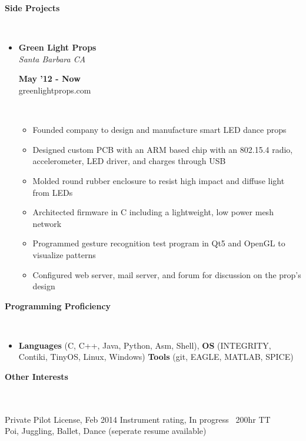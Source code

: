 \documentclass[a4paper,11pt]{article}
\newcommand{\lsep}{-0.5cm}
\newcommand{\resheading}[1]{{\small \colorbox{mygrey}{\begin{minipage}{0.975\textwidth}{\textbf{#1 \vphantom{p\^{E}}}}\end{minipage}}}}
\newcommand{\workexp}[4]{
\begin{minipage}[t]{7cm}
\flushleft
\textbf{#1} \\
\indent \emph{#2}\\
\end{minipage}
\begin{minipage}[t]{7cm}
\flushright
\textbf{#3} \\
\indent #4 \\
\end{minipage}
}
\begin{document}

\resheading{\textbf{Side Projects}}\\[\lsep]

\begin{itemize}
\item \workexp{Green Light Props}{Santa Barbara CA}{May '12 - Now}{greenlightprops.com}
\\[-0.2cm]
	\begin{itemize}
	\item Founded company to design and manufacture smart LED dance props
	\item Designed custom PCB with an ARM based chip with an 802.15.4 radio, accelerometer, LED driver, and charges through USB
	\item Molded round rubber enclosure to resist high impact and diffuse light from LEDs
	\item Architected firmware in C including a lightweight, low power mesh network
	\item Programmed gesture recognition test program in Qt5 and OpenGL to visualize patterns
	\item Configured web server, mail server, and forum for discussion on the prop's design
	\end{itemize}
\end{itemize}



\resheading{\textbf{Programming Proficiency} }\\[\lsep]
\begin{itemize}
\item \noindent \textbf{Languages} (C, C++, Java, Python, Asm, Shell),  \textbf{OS} (INTEGRITY, Contiki, TinyOS, Linux, Windows) \textbf{Tools} (git, EAGLE, MATLAB, SPICE)
\end{itemize}



\resheading{\textbf{Other Interests} }\\[\lsep]
\\[0.2cm]
\indent Private Pilot License, Feb 2014 \indent Instrument rating, In progress \indent ~200hr TT\\
\indent Poi, Juggling, Ballet, Dance (seperate resume available)
\end{document}
